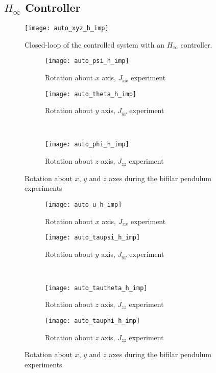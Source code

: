 \begin{appendices}
\subsection*{$H_\infty$ Controller}

\begin{figure}[h]
	\begin{center}
	\texttt{[image: auto\_xyz\_h\_imp]}
	\caption{Closed-loop of the controlled system with an $H_{\infty}$ controller.}
	\label{fig:auto_xyz_h_imp}
	\end{center}
	\end{figure}
	
\begin{figure}[H]
\begin{subfigure}{.5\linewidth}
\centering
\texttt{[image: auto\_psi\_h\_imp]}
\caption{Rotation about $x$ axis, $J_{xx}$ experiment}
\label{fig:auto_psi_h_imp}
\end{subfigure}%
\begin{subfigure}{.5\linewidth}
\centering
\texttt{[image: auto\_theta\_h\_imp]}
\caption{Rotation about $y$ axis, $J_{yy}$ experiment}
\label{fig:auto_theta_h_imp}
\end{subfigure}\\[1ex]
\begin{subfigure}{\linewidth}
\centering
\texttt{[image: auto\_phi\_h\_imp]}
\caption{Rotation about $z$ axis, $J_{zz}$ experiment}
\label{fig:auto_psi_h_imp}
\end{subfigure}
\caption{Rotation about $x$, $y$ and $z$ axes during the bifilar pendulum experiments}
\label{fig:auto_h_imp}
\end{figure}


\begin{figure}[H]
\begin{subfigure}{.5\linewidth}
\centering
\texttt{[image: auto\_u\_h\_imp]}
\caption{Rotation about $x$ axis, $J_{xx}$ experiment}
\label{fig:auto_u_h_imp}
\end{subfigure}%
\begin{subfigure}{.5\linewidth}
\centering
\texttt{[image: auto\_taupsi\_h\_imp]}
\caption{Rotation about $y$ axis, $J_{yy}$ experiment}
\label{fig:auto_taupsi_h_imp}
\end{subfigure}\\[1ex]
\begin{subfigure}{0.5\linewidth}
\centering
\texttt{[image: auto\_tautheta\_h\_imp]}
\caption{Rotation about $z$ axis, $J_{zz}$ experiment}
\label{fig:auto_tautheta_h_imp}
\end{subfigure}
\begin{subfigure}{0.5\linewidth}
\centering
\texttt{[image: auto\_tauphi\_h\_imp]}
\caption{Rotation about $z$ axis, $J_{zz}$ experiment}
\label{fig:auto_tauphi_h_imp}
\end{subfigure}
\caption{Rotation about $x$, $y$ and $z$ axes during the bifilar pendulum experiments}
\label{fig:auto_control_h}
\end{figure}


\end{appendices}
